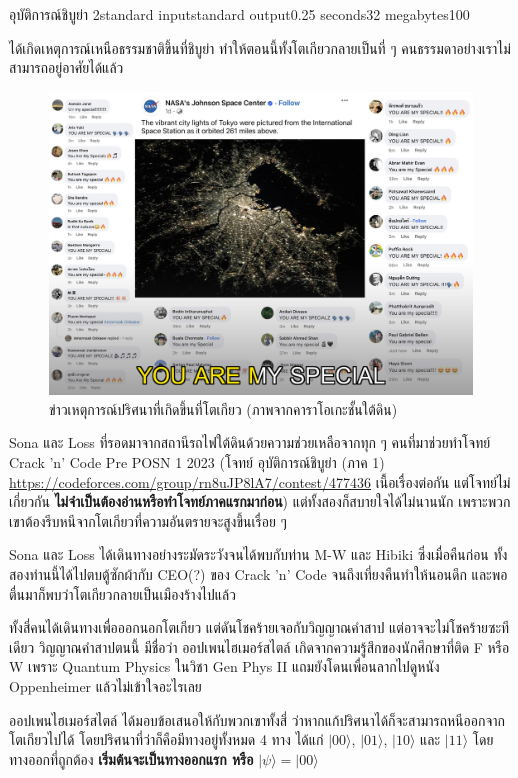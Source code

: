 \documentclass[11pt,a4paper]{article}
\begin{document}
\begin{problem}{อุบัติการณ์ชิบูย่า 2}{standard input}{standard output}{0.25 seconds}{32 megabytes}{100}

ได้เกิดเหตุการณ์เหนือธรรมชาติขึ้นที่ชิบูย่า ทำให้ตอนนี้ทั้งโตเกียวกลายเป็นที่ ๆ คนธรรมดาอย่างเราไม่สามารถอยู่อาศัยได้แล้ว

\begin{figure}[htp]
\centering
\includegraphics[width=14cm]{shibuyajihen2/urmyspecial.jpg}
\caption{ข่าวเหตุการณ์ปริศนาที่เกิดขึ้นที่โตเกียว (ภาพจากคาราโอเกะชั้นใต้ดิน)}
\end{figure}

Sona และ Loss ที่รอดมาจากสถานีรถไฟใต้ดินด้วยความช่วยเหลือจากทุก ๆ คนที่มาช่วยทำโจทย์ Crack 'n' Code Pre POSN 1 2023 (โจทย์ อุบัติการณ์ชิบูย่า (ภาค 1) \url{https://codeforces.com/group/rn8uJP8lA7/contest/477436} เนื้อเรื่องต่อกัน แต่โจทย์ไม่เกี่ยวกัน \textbf{ไม่จำเป็นต้องอ่านหรือทำโจทย์ภาคแรกมาก่อน}) แต่ทั้งสองก็สบายใจได้ไม่นานนัก เพราะพวกเขาต้องรีบหนีจากโตเกียวที่ความอันตรายจะสูงขึ้นเรื่อย ๆ

Sona และ Loss ได้เดินทางอย่างระมัดระวังจนได้พบกับท่าน M-W และ Hibiki ซึ่งเมื่อคืนก่อน ทั้งสองท่านนี้ได้ไปตบตู้ซักผ้ากับ CEO(?) ของ Crack 'n' Code จนถึงเที่ยงคืนทำให้นอนดึก และพอตื่นมาก็พบว่าโตเกียวกลายเป็นเมืองร้างไปแล้ว

ทั้งสี่คนได้เดินทางเพื่อออกนอกโตเกียว แต่ดันโชคร้ายเจอกับวิญญาณคำสาป แต่อาจจะไม่โชคร้ายซะทีเดียว วิญญาณคำสาปตนนี้ มีชื่อว่า ออปเพนไฮเมอร์สไตล์ เกิดจากความรู้สึกของนักศึกษาที่ติด F หรือ W เพราะ Quantum Physics ในวิชา Gen Phys II แถมยังโดนเพื่อนลากไปดูหนัง Oppenheimer แล้วไม่เข้าใจอะไรเลย

ออปเพนไฮเมอร์สไตล์ ได้มอบข้อเสนอให้กับพวกเขาทั้งสี่ ว่าหากแก้ปริศนาได้ก็จะสามารถหนีออกจากโตเกียวไปได้ โดยปริศนาที่ว่าก็คือมีทางอยู่ทั้งหมด 4 ทาง ได้แก่ $|00\rangle$, $|01\rangle$, $|10\rangle$ และ $|11\rangle$ โดยทางออกที่ถูกต้อง \textbf{เริ่มต้นจะเป็นทางออกแรก หรือ} $|\psi\rangle = |00\rangle$


\end{problem}
\end{document}
